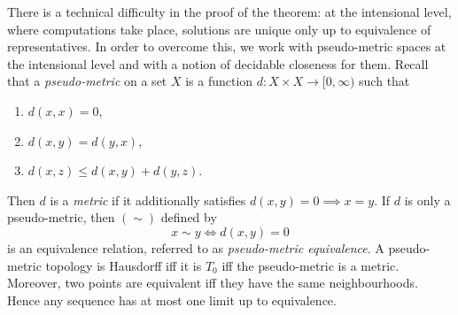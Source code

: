 \documentclass[10pt]{article}
\begin{document}
\medskip There is a technical difficulty in the proof of the theorem:
at the intensional level, where computations take place, solutions are
unique only up to equivalence of representatives.  In order to
overcome this, we work with pseudo-metric spaces at the intensional
level and with a notion of decidable closeness for them.  Recall that
a \emph{pseudo-metric} on a set $X$ is a function $d \colon X \times X
\to [0,\infty)$ such that
\begin{enumerate}
\item $d(x,x)=0$,
\item $d(x,y) = d(y,x)$,
\item $d(x,z) \le d(x,y) + d(y,z)$.
\end{enumerate}
Then $d$ is a \emph{metric} if it additionally satisfies $d(x,y)=0 \implies x=y$.
If $d$ is only a pseudo-metric, then $(\sim)$ defined by
\[
x \sim y \iff d(x,y)=0
\]
is an equivalence relation, referred to as \emph{pseudo-metric
  equivalence}.  A pseudo-metric topology is Hausdorff iff it is $T_0$
iff the pseudo-metric is a metric. Moreover, two points are
equivalent iff they have the same neighbourhoods.  Hence any sequence
has at most one limit up to equivalence.
\end{document}
